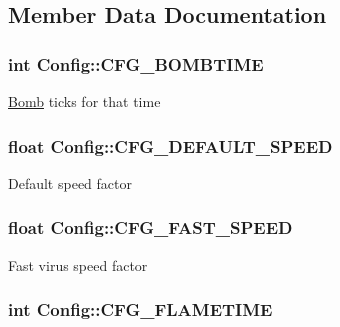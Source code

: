 \subsection{Member Data Documentation}
\hypertarget{struct_config_a0574d1159f4788df4ba510d1d3e83498}{
\subsubsection[{C\-F\-G\-\_\-\-B\-O\-M\-B\-T\-I\-M\-E}]{\setlength{\rightskip}{0pt plus 5cm}int Config\-::\-C\-F\-G\-\_\-\-B\-O\-M\-B\-T\-I\-M\-E}}\label{struct_config_a0574d1159f4788df4ba510d1d3e83498}
\hyperlink{class_bomb}{Bomb} ticks for that time \hypertarget{struct_config_a8f2b0ec592b0bda65e2133e21fe46979}{
\subsubsection[{C\-F\-G\-\_\-\-D\-E\-F\-A\-U\-L\-T\-\_\-\-S\-P\-E\-E\-D}]{\setlength{\rightskip}{0pt plus 5cm}float Config\-::\-C\-F\-G\-\_\-\-D\-E\-F\-A\-U\-L\-T\-\_\-\-S\-P\-E\-E\-D}}\label{struct_config_a8f2b0ec592b0bda65e2133e21fe46979}
Default speed factor \hypertarget{struct_config_a2e8f4b387f08e51b6bfc9c27905beb60}{
\subsubsection[{C\-F\-G\-\_\-\-F\-A\-S\-T\-\_\-\-S\-P\-E\-E\-D}]{\setlength{\rightskip}{0pt plus 5cm}float Config\-::\-C\-F\-G\-\_\-\-F\-A\-S\-T\-\_\-\-S\-P\-E\-E\-D}}\label{struct_config_a2e8f4b387f08e51b6bfc9c27905beb60}
Fast virus speed factor \hypertarget{struct_config_a2660688203b9170918c7e2e8e5b54ed4}{
\subsubsection[{C\-F\-G\-\_\-\-F\-L\-A\-M\-E\-T\-I\-M\-E}]{\setlength{\rightskip}{0pt plus 5cm}int Config\-::\-C\-F\-G\-\_\-\-F\-L\-A\-M\-E\-T\-I\-M\-E}}\label{struct_config_a2660688203b9170918c7e2e8e5b54ed4}
